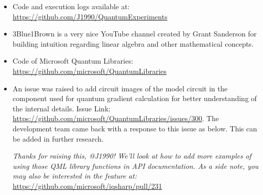 \documentclass[english,a4paper,11pt,oneside,onecolumn]{book}
\begin{document}
\begin{itemize}
    \item Code and execution logs available at: \url{https://github.com/J1990/QuantumExperiments}
    
    \item 3Blue1Brown \cite{a3blue1brown_2016_vectors} is a very nice YouTube channel created by Grant Sanderson for building intuition regarding linear algebra and other mathematical concepts.
    
    \item Code of Microsoft Quantum Libraries: \url{https://github.com/microsoft/QuantumLibraries}
    
    \item An issue was raised to add circuit images of the model circuit in the component used for quantum gradient calculation for better understanding of the internal details. Issue Link: \url{https://github.com/microsoft/QuantumLibraries/issues/300}.
    The development team came back with a response to this issue as below. This can be added in further research.
    
    \begin{displayquote}
    \emph{Thanks for raising this, @J1990! We'll look at how to add more examples of using those QML library functions in API documentation. As a side note, you may also be interested in the feature at:} \url{https://github.com/microsoft/iqsharp/pull/231}
    \end{displayquote}
\end{itemize}
\end{document}
